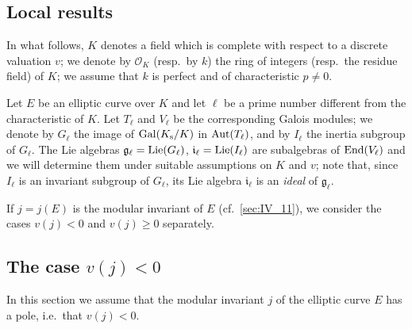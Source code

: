 \begin{subappendices}

\section{Local results}
\label{sec:IV_A}
\dpage
In what follows, $K$ denotes a field which is complete with respect to a
discrete valuation $v$; we denote by $\mathcal{O}_K$ (resp.\ by $k$) the ring
of integers (resp.\ the residue field) of $K$; we assume that $k$ is perfect
and of characteristic $p \ne 0$.

Let $E$ be an elliptic curve over $K$ and let $\ell$ be a prime number
different from the characteristic of $K$. Let $T_\ell$ and $V_\ell$ be the
corresponding Galois modules; we denote by $G_\ell$ the image of $\operatorname{Gal}(K_{\mathrm{s}}/K)$ in $\operatorname{Aut}(T_\ell)$, and by $I_\ell$ the inertia subgroup of $G_\ell$. The
Lie algebras $\mathfrak{g}_\ell = \operatorname{Lie}(G_\ell)$, $\mathfrak{i}_\ell =
\operatorname{Lie}(I_\ell)$ are subalgebras of $\operatorname{End}(V_\ell)$ and we will determine them
under suitable assumptions on $K$ and $v$; note that, since $I_\ell$ is an
invariant subgroup of $G_\ell$, its Lie algebra $\mathfrak{i}_\ell$ is an
\emph{ideal} of $\mathfrak{g}_\ell$.

If $j = j(E)$ is the modular invariant of $E$ (cf.\ \ref{sec:IV_11}), we
consider the cases $v(j) < 0$ and $v(j) \ge 0$ separately.

\subsection{The case $v(j) < 0$}
\label{sec:IV_A1}
In this section we assume that the modular invariant $j$ of the elliptic curve
$E$ has a pole, i.e.\ that $v(j) < 0$.


\end{subappendices}
